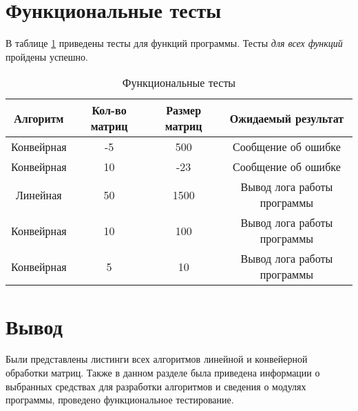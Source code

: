 \section{Функциональные тесты}

В таблице \ref{tbl:functional_test} приведены тесты для функций программы. Тесты \textit{для всех функций} пройдены успешно.

\begin{table}[h]
	\begin{center}
        \begin{threeparttable}
        \captionsetup{justification=raggedright,singlelinecheck=off}
		\caption{\label{tbl:functional_test} Функциональные тесты}
		\begin{tabular}{|c|c|c|c|}
			\hline
			Алгоритм & Кол-во матриц & Размер матриц & Ожидаемый результат \\
			\hline
            Конвейрная & -5 & 500 & Сообщение об ошибке \\
            \hline
            Конвейрная & 10 & -23 & Сообщение об ошибке \\
            \hline
			Линейная & 50 & 1500 & Вывод лога работы программы \\
            \hline
			Конвейрная & 10 & 100 & Вывод лога работы программы \\
			\hline
			Конвейрная & 5 & 10 & Вывод лога работы программы \\
			\hline
		\end{tabular}
        \end{threeparttable}
	\end{center}
\end{table}

\section{Вывод}

Были представлены листинги всех алгоритмов линейной и конвейерной обработки матриц. Также в данном разделе была приведена информации о выбранных средствах для разработки алгоритмов и сведения о модулях программы, проведено функциональное тестирование.
